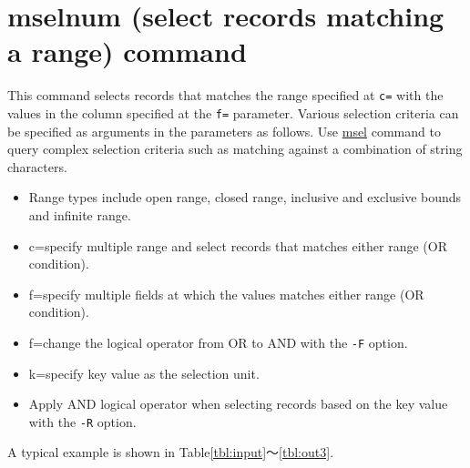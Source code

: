 \documentclass[a4paper]{jarticle}
\begin{document}
\renewcommand{\tablename}{Table }

\setlength{\baselineskip}{4mm}

\section*{mselnum (select records matching a range) command}
This command selects records that matches the range specified at \verb|c=| with the values in the column specified at the \verb|f=| parameter. Various selection criteria can be specified as arguments in the parameters as follows. Use \href{run:msel.pdf}{msel} command to query complex selection criteria such as matching against a combination of string characters. 

\begin{itemize}
\item Range types include open range, closed range, inclusive and exclusive bounds and infinite range.
\item c=specify multiple range and select records that matches either range (OR condition).
\item f=specify multiple fields at which the values matches either range (OR condition).
\item f=change the logical operator from OR to AND with the \verb|-F| option.  
\item k=specify key value as the selection unit. 
 \item Apply AND logical operator when selecting records based on the key value with the \verb|-R| option.

\end{itemize}

A typical example is shown in Table\ref{tbl:input}〜\ref{tbl:out3}.
\end{document}
